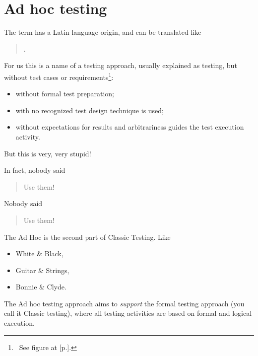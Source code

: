 \section{Ad hoc testing}
\label{sec:Ad hoc testing}

The term  has a Latin language origin, and can be translated like 

	\begin{quote}
	.
	\end{quote} 

For us this is a name of a testing approach, usually explained as testing, but without test cases or requirements\footnote{~See figure  at [p.\pageref{fig:ClassicAdHocExploratoryTesting}].}:

\begin{itemize}
\item without formal test preparation;
\item with no recognized test design technique is used;
\item without expectations for results and arbitrariness guides the test execution activity. 
\end{itemize}

But this is very, very stupid!

In fact, nobody said 
\begin{quote}
Use them!
\end{quote} 

Nobody said 
\begin{quote}
Use them!
\end{quote} 

The Ad Hoc is the second part of Classic Testing. Like 
\begin{itemize}
\item 
White \& Black, 
\item 
Guitar \& Strings, 
\item 
Bonnie \& Clyde.
\end{itemize}

The Ad hoc testing approach aims to \emph{support} the formal testing approach (you call it Classic testing), where all testing activities are based on formal and logical execution.

